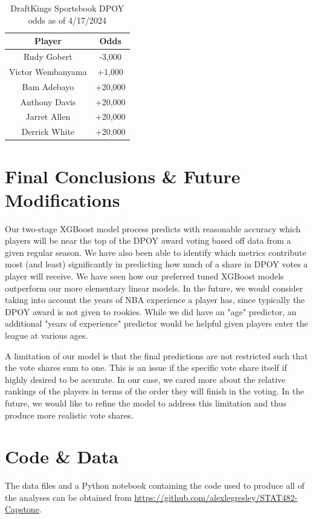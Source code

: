 \documentclass[letterpaper,titlepage]{article}
\begin{document}
    \begin{table}[H]
        \centering
        \caption{DraftKings Sportsbook DPOY odds as of 4/17/2024}
        \label{Tab:Vegas}
        \begin{tabular}{c|c}
            \textbf{Player}   & \textbf{Odds} \\ \hline
            \rowcolor[HTML]{EFEFEF} 
            Rudy Gobert       & -3,000        \\
            Victor Wembanyama & +1,000        \\
            \rowcolor[HTML]{EFEFEF} 
            Bam Adebayo       & +20,000       \\
            Anthony Davis     & +20,000       \\
            \rowcolor[HTML]{EFEFEF} 
            Jarret Allen      & +20,000       \\
            Derrick White     & +20,000      
        \end{tabular}
    \end{table}


    \section{Final Conclusions \& Future Modifications}
    Our two-stage XGBoost model process predicts with reasonable accuracy which players will be near the top of the DPOY award voting based off data from a given regular season. We have also been able to identify which metrics contribute most (and least) significantly in predicting how much of a share in DPOY votes a player will receive. We have seen how our preferred tuned XGBoost models outperform our more elementary linear models. In the future, we would consider taking into account the years of NBA experience a player has, since typically the DPOY award is not given to rookies. While we did have an "age" predictor, an additional "years of experience" predictor would be helpful given players enter the league at various ages.

    A limitation of our model is that the final predictions are not restricted such that the vote shares sum to one. This is an issue if the specific vote share itself if highly desired to be accurate. In our case, we cared more about the relative rankings of the players in terms of the order they will finish in the voting. In the future, we would like to refine the model to address this limitation and thus produce more realistic vote shares.


    \section{Code \& Data}
    The data files and a Python notebook containing the code used to produce all of the analyses can be obtained from \url{https://github.com/alexlegresley/STAT482-Capstone}.


    \printbibliography[heading=bibnumbered]
    
\end{document}

